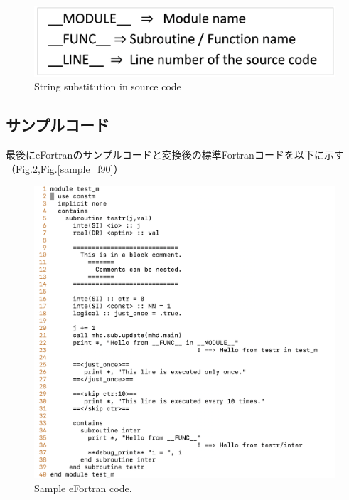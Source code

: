 \documentclass[12pt]{jsarticle}
\begin{document}
\begin{figure}[H]
\centering
\includegraphics[height=0.5\textheight,width=1.0\hsize,angle=0,keepaspectratio]{./Image/macros4.png}
\caption{String substitution in source code} \label{macros}
\end{figure}

\newpage

\subsection{サンプルコード}
最後にeFortranのサンプルコードと変換後の標準Fortranコードを以下に示す（Fig.\ref{sample_e03},Fig.\ref{sample_f90}）

\begin{figure}[H]
\centering
\includegraphics[height=1.0\textheight,width=1.0\hsize,angle=0,keepaspectratio]{./Image/sample2_e03.png}
\caption{Sample eFortran code.} \label{sample_e03}
\end{figure}
\end{document}

